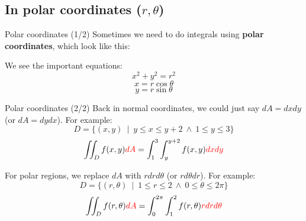 \subsection{In polar coordinates ($r,\theta$)}
\begin{frame}{Polar coordinates (1/2)}
    Sometimes we need to do integrals using \textbf{polar coordinates}, which look like this:

    \vspace{0.3mm}
    \begin{minipage}{0.6\textwidth}
    
    \end{minipage}
    \begin{minipage}{0.35\textwidth}
        We see the important equations:
        \[\boxed{x^2+y^2=r^2}\]
        \[\boxed{x=r\cos\theta}\]
        \[\boxed{y=r\sin\theta}\]
    \end{minipage}
\end{frame}

\begin{frame}{Polar coordinates (2/2)}
    Back in normal coordinates, we could just say $dA=dxdy$ (or $dA=dydx$). For example:
    \[D=\{(x,y)~\mid~y\leq x\leq y+2~\land~1\leq y\leq 3\}\]
    \[\iint_D f(x,y) \textcolor{red}{dA} = \int_{1}^{3}\int_{y}^{y+2}f(x,y)\textcolor{red}{dxdy}\]

    For polar regions, we replace $dA$ with $rdrd\theta$ (or $rd\theta dr$). For example:
    \[D=\{(r,\theta)~\mid~1\leq r\leq 2~\land~0\leq\theta\leq2\pi\}\]
    \[\iint_D f(r,\theta) \textcolor{red}{dA} = \int_{0}^{2\pi}\int_{1}^{2}f(r,\theta)\textcolor{red}{rdrd\theta}\]
\end{frame}



